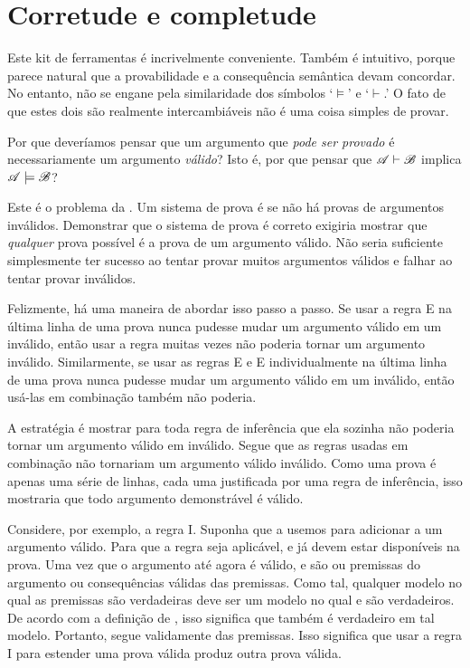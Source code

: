 \section{Corretude e completude}

Este kit de ferramentas é incrivelmente conveniente. Também é intuitivo, porque parece natural que a provabilidade e a consequência semântica devam concordar. No entanto, não se engane pela similaridade dos símbolos `$\models$' e `$\vdash$.' O fato de que estes dois são realmente intercambiáveis não é uma coisa simples de provar.

Por que deveríamos pensar que um argumento que \emph{pode ser provado} é necessariamente um argumento \emph{válido}? Isto é, por que pensar que $\mathscr{A}\vdash\mathscr{B}$ implica $\mathscr{A}\models\mathscr{B}$?

Este é o problema da . Um sistema de prova é  se não há provas de argumentos inválidos. Demonstrar que o sistema de prova é correto exigiria mostrar que \emph{qualquer} prova possível é a prova de um argumento válido. Não seria suficiente simplesmente ter sucesso ao tentar provar muitos argumentos válidos e falhar ao tentar provar inválidos.

Felizmente, há uma maneira de abordar isso passo a passo. Se usar a regra {\eand}E na última linha de uma prova nunca pudesse mudar um argumento válido em um inválido, então usar a regra muitas vezes não poderia tornar um argumento inválido. Similarmente, se usar as regras {\eand}E e {\eor}E individualmente na última linha de uma prova nunca pudesse mudar um argumento válido em um inválido, então usá-las em combinação também não poderia.

A estratégia é mostrar para toda regra de inferência que ela sozinha não poderia tornar um argumento válido em inválido. Segue que as regras usadas em combinação não tornariam um argumento válido inválido. Como uma prova é apenas uma série de linhas, cada uma justificada por uma regra de inferência, isso mostraria que todo argumento demonstrável é válido.

Considere, por exemplo, a regra {\eand}I. Suponha que a usemos para adicionar \eand{} a um argumento válido. Para que a regra seja aplicável,  e  já devem estar disponíveis na prova. Uma vez que o argumento até agora é válido,  e  são ou premissas do argumento ou consequências válidas das premissas. Como tal, qualquer modelo no qual as premissas são verdadeiras deve ser um modelo no qual  e  são verdadeiros. De acordo com a definição de , isso significa que \eand{} também é verdadeiro em tal modelo. Portanto, \eand{} segue validamente das premissas. Isso significa que usar a regra {\eand}I para estender uma prova válida produz outra prova válida.

